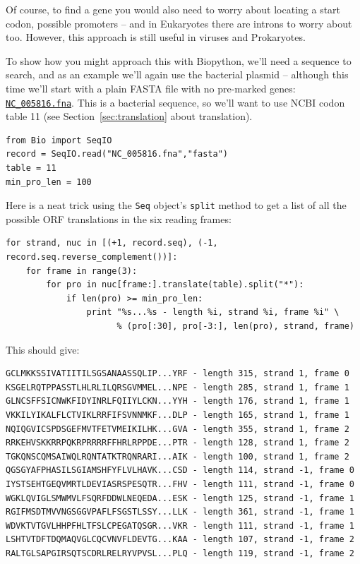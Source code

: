 \documentclass{report}
\begin{document}
Of course, to find a gene you would also need to worry about locating a start
codon, possible promoters -- and in Eukaryotes there are introns to worry about
too.  However, this approach is still useful in viruses and Prokaryotes.

To show how you might approach this with Biopython, we'll need a sequence to
search, and as an example we'll again use the bacterial plasmid -- although
this time we'll start with a plain FASTA file with no pre-marked genes:
\href{http://biopython.org/SRC/biopython/Tests/GenBank/NC_005816.fna}
{\texttt{NC\_005816.fna}}. This is a bacterial sequence, so we'll want to use
NCBI codon table 11 (see Section~\ref{sec:translation} about translation).

\begin{verbatim}
from Bio import SeqIO 
record = SeqIO.read("NC_005816.fna","fasta")
table = 11
min_pro_len = 100
\end{verbatim}

Here is a neat trick using the \verb|Seq| object's \verb|split| method to
get a list of all the possible ORF translations in the six reading frames:

\begin{verbatim}
for strand, nuc in [(+1, record.seq), (-1, record.seq.reverse_complement())]:
    for frame in range(3):
        for pro in nuc[frame:].translate(table).split("*"):
            if len(pro) >= min_pro_len:
                print "%s...%s - length %i, strand %i, frame %i" \
                      % (pro[:30], pro[-3:], len(pro), strand, frame)
\end{verbatim}

\noindent This should give:

\begin{verbatim}
GCLMKKSSIVATIITILSGSANAASSQLIP...YRF - length 315, strand 1, frame 0
KSGELRQTPPASSTLHLRLILQRSGVMMEL...NPE - length 285, strand 1, frame 1
GLNCSFFSICNWKFIDYINRLFQIIYLCKN...YYH - length 176, strand 1, frame 1
VKKILYIKALFLCTVIKLRRFIFSVNNMKF...DLP - length 165, strand 1, frame 1
NQIQGVICSPDSGEFMVTFETVMEIKILHK...GVA - length 355, strand 1, frame 2
RRKEHVSKKRRPQKRPRRRRFFHRLRPPDE...PTR - length 128, strand 1, frame 2
TGKQNSCQMSAIWQLRQNTATKTRQNRARI...AIK - length 100, strand 1, frame 2
QGSGYAFPHASILSGIAMSHFYFLVLHAVK...CSD - length 114, strand -1, frame 0
IYSTSEHTGEQVMRTLDEVIASRSPESQTR...FHV - length 111, strand -1, frame 0
WGKLQVIGLSMWMVLFSQRFDDWLNEQEDA...ESK - length 125, strand -1, frame 1
RGIFMSDTMVVNGSGGVPAFLFSGSTLSSY...LLK - length 361, strand -1, frame 1
WDVKTVTGVLHHPFHLTFSLCPEGATQSGR...VKR - length 111, strand -1, frame 1
LSHTVTDFTDQMAQVGLCQCVNVFLDEVTG...KAA - length 107, strand -1, frame 2
RALTGLSAPGIRSQTSCDRLRELRYVPVSL...PLQ - length 119, strand -1, frame 2
\end{verbatim}
\end{document}
